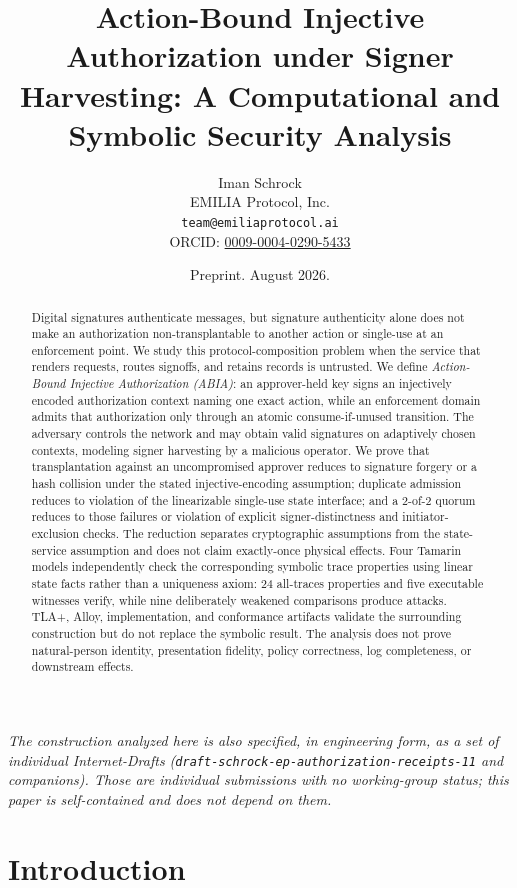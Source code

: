 \documentclass[11pt]{article}
\title{Action-Bound Injective Authorization under Signer Harvesting: A
Computational and Symbolic Security Analysis}
\author{Iman Schrock\\
EMILIA Protocol, Inc.\\
\texttt{team@emiliaprotocol.ai}\\
ORCID: \href{https://orcid.org/0009-0004-0290-5433}{0009-0004-0290-5433}}
\date{Preprint. August 2026.}
\newcommand{\code}[1]{\texttt{#1}}
\begin{document}
\maketitle

\begin{center}
\emph{The construction analyzed here is also specified, in engineering form, as a
set of individual Internet-Drafts (\code{draft-schrock-ep-authorization-receipts-11}
and companions). Those are individual submissions with no working-group status;
this paper is self-contained and does not depend on them.}
\end{center}

\begin{abstract}
Digital signatures authenticate messages, but signature authenticity alone does
not make an authorization non-transplantable to another action or single-use at
an enforcement point. We study this
protocol-composition problem when the service that renders requests, routes
signoffs, and retains records is untrusted. We define \emph{Action-Bound
Injective Authorization (ABIA)}: an approver-held key signs an injectively
encoded authorization context naming one exact action, while an enforcement
domain admits that authorization only through an atomic consume-if-unused
transition. The adversary controls the network and may obtain valid signatures
on adaptively chosen contexts, modeling signer harvesting by a malicious
operator. We prove that transplantation against an uncompromised approver
reduces to signature forgery or a hash collision under the stated
injective-encoding assumption;
duplicate admission reduces to violation of the linearizable single-use state
interface; and a 2-of-2 quorum reduces to those failures or violation of explicit
signer-distinctness and initiator-exclusion checks. The reduction separates
cryptographic assumptions from the state-service assumption and does not claim
exactly-once physical effects. Four Tamarin models independently check the
corresponding symbolic trace properties using linear state facts rather than a
uniqueness axiom: 24 all-traces properties and five executable witnesses
verify, while nine deliberately weakened comparisons produce attacks. TLA+,
Alloy,
implementation, and conformance artifacts validate the surrounding construction
but do not replace the symbolic result. The analysis does not prove
natural-person identity, presentation fidelity, policy correctness,
log completeness, or downstream effects.
\end{abstract}

\section{Introduction}
\end{document}
